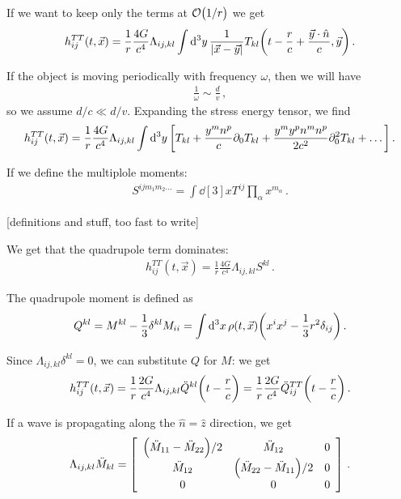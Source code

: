 \documentclass[main.tex]{subfiles}
\begin{document}
If we want to keep only the terms at \(\order{1/r}\) we get 
%
\begin{align}
h_{ij}^{TT} (t, \vec{x}) = \frac{1}{r} \frac{4G}{c^{4}}
\Lambda_{ij, kl} \int \dd[3]{y} \frac{1}{\abs{\vec{x} - \vec{y}}}
T_{kl} \qty(t - \frac{r}{c} + \frac{\vec{y} \cdot \hat{n}}{c}, \vec{y})
\,.
\end{align}

If the object is moving periodically with frequency \(\omega \), then we will have 
%
\begin{align}
\frac{1}{\omega } \sim \frac{d}{v}
\,,
\end{align}
%
so we assume \(d/c \ll d/v\). Expanding the stress energy tensor, we find 
%
\begin{align}
h_{ij}^{TT} (t, \vec{x}) = \frac{1}{r} \frac{4G}{c^{4}} \Lambda_{ij, kl} \int \dd[3]{y}\qty[T_{kl} + \frac{y^{m} n^{p}}{c} \partial_0 T_{kl}  + \frac{y^{m} y^{p} n^{m} n^{p}}{2c^2} \partial_0^2 T_{kl} + \dots]
\,.
\end{align}

If we define the multiplole moments: 
%
\begin{align}
S^{ij m_1 m_2 \dots} = \int \dd[3]{x} T^{ij} \prod_\alpha  x^{m_\alpha }
\,.
\end{align}

[definitions and stuff, too fast to write]

We get that the quadrupole term dominates: 
%
\begin{align}
h_{ij}^{TT} (t, \vec{x}) = \frac{1}{r} \frac{4G}{c^{4}}
\Lambda_{ij, kl} S^{kl}
\,.
\end{align}

The quadrupole moment is defined as 
%
\begin{align}
Q^{kl} = M^{kl} - \frac{1}{3} \delta^{kl} M_{ii} 
= \int \dd[3]{x} \rho (t, \vec{x}) \qty(x^{i} x^{j} - \frac{1}{3} r^2 \delta_{ij})
\,.
\end{align}

Since \(\Lambda_{ij, kl} \delta^{kl} =0 \), we can substitute \(Q\) for \(M\): we get 
%
\begin{align}
h_{ij}^{TT} (t, \vec{x}) = \frac{1}{r} \frac{2G}{c^{4}}
\Lambda_{ij, kl} \ddot{Q}^{kl} \qty(t - \frac{r}{c})
= \frac{1}{r} \frac{2G}{c^{4}} \ddot{Q}^{TT}_{ij} \qty(t - \frac{r}{c})
\,.
\end{align}

If a wave is propagating along the \(\hat{n} = \hat{z}\) direction, we get 
%
\begin{subequations}
\begin{align}
\Lambda_{ij, kl} \ddot{M}_{kl} = \left[\begin{array}{ccc}
\qty(\ddot{M}_{11} - \ddot{M}_{22}) / 2 &  \ddot{M}_{12} & 0 \\ 
\ddot{M}_{12} & \qty(\ddot{M}_{22} - \ddot{M}_{11}) / 2 & 0 \\ 
0 & 0 & 0
\end{array}\right]
\,.
\end{align}
\end{subequations}
\end{document}
